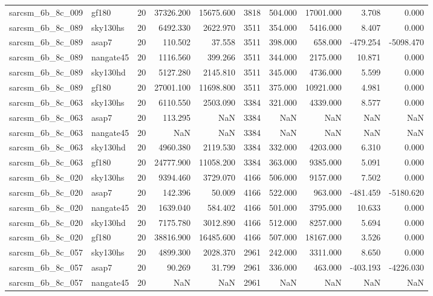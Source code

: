 \begin{tabular}{llrrrrrrrr}
sarcsm\_6b\_8c\_009 & gf180 & 20 & 37326.200 & 15675.600 & 3818 & 504.000 & 17001.000 & 3.708 & 0.000 \\
sarcsm\_6b\_8c\_089 & sky130hs & 20 & 6492.330 & 2622.970 & 3511 & 354.000 & 5416.000 & 8.407 & 0.000 \\
sarcsm\_6b\_8c\_089 & asap7 & 20 & 110.502 & 37.558 & 3511 & 398.000 & 658.000 & -479.254 & -5098.470 \\
sarcsm\_6b\_8c\_089 & nangate45 & 20 & 1116.560 & 399.266 & 3511 & 344.000 & 2175.000 & 10.871 & 0.000 \\
sarcsm\_6b\_8c\_089 & sky130hd & 20 & 5127.280 & 2145.810 & 3511 & 345.000 & 4736.000 & 5.599 & 0.000 \\
sarcsm\_6b\_8c\_089 & gf180 & 20 & 27001.100 & 11698.800 & 3511 & 375.000 & 10921.000 & 4.981 & 0.000 \\
sarcsm\_6b\_8c\_063 & sky130hs & 20 & 6110.550 & 2503.090 & 3384 & 321.000 & 4339.000 & 8.577 & 0.000 \\
sarcsm\_6b\_8c\_063 & asap7 & 20 & 113.295 & NaN & 3384 & NaN & NaN & NaN & NaN \\
sarcsm\_6b\_8c\_063 & nangate45 & 20 & NaN & NaN & 3384 & NaN & NaN & NaN & NaN \\
sarcsm\_6b\_8c\_063 & sky130hd & 20 & 4960.380 & 2119.530 & 3384 & 332.000 & 4203.000 & 6.310 & 0.000 \\
sarcsm\_6b\_8c\_063 & gf180 & 20 & 24777.900 & 11058.200 & 3384 & 363.000 & 9385.000 & 5.091 & 0.000 \\
sarcsm\_6b\_8c\_020 & sky130hs & 20 & 9394.460 & 3729.070 & 4166 & 506.000 & 9157.000 & 7.502 & 0.000 \\
sarcsm\_6b\_8c\_020 & asap7 & 20 & 142.396 & 50.009 & 4166 & 522.000 & 963.000 & -481.459 & -5180.620 \\
sarcsm\_6b\_8c\_020 & nangate45 & 20 & 1639.040 & 584.402 & 4166 & 501.000 & 3795.000 & 10.633 & 0.000 \\
sarcsm\_6b\_8c\_020 & sky130hd & 20 & 7175.780 & 3012.890 & 4166 & 512.000 & 8257.000 & 5.694 & 0.000 \\
sarcsm\_6b\_8c\_020 & gf180 & 20 & 38816.900 & 16485.600 & 4166 & 507.000 & 18167.000 & 3.526 & 0.000 \\
sarcsm\_6b\_8c\_057 & sky130hs & 20 & 4899.300 & 2028.370 & 2961 & 242.000 & 3311.000 & 8.650 & 0.000 \\
sarcsm\_6b\_8c\_057 & asap7 & 20 & 90.269 & 31.799 & 2961 & 336.000 & 463.000 & -403.193 & -4226.030 \\
sarcsm\_6b\_8c\_057 & nangate45 & 20 & NaN & NaN & 2961 & NaN & NaN & NaN & NaN \\

\end{tabular}
